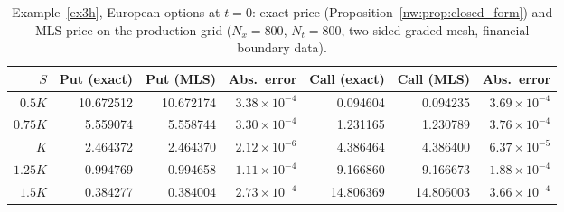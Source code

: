 \begin{table}[htbp]
\centering
\footnotesize
\caption{Example~\ref{ex3h}, European options at $t=0$: exact price (Proposition~\ref{nw:prop:closed_form}) and MLS price on the production grid ($N_x=800$, $N_t=800$, two-sided graded mesh, financial boundary data).}
\label{tab:ex1_european_pointwise}
\begin{tabular}{rrrrrrr}
\toprule
$S$ & Put (exact) & Put (MLS) & Abs.\ error & Call (exact) & Call (MLS) & Abs.\ error \\
\midrule
$0.5K$ & 10.672512 & 10.672174 & $3.38\times10^{-4}$ & 0.094604 & 0.094235 & $3.69\times10^{-4}$ \\
$0.75K$ & 5.559074 & 5.558744 & $3.30\times10^{-4}$ & 1.231165 & 1.230789 & $3.76\times10^{-4}$ \\
$K$ & 2.464372 & 2.464370 & $2.12\times10^{-6}$ & 4.386464 & 4.386400 & $6.37\times10^{-5}$ \\
$1.25K$ & 0.994769 & 0.994658 & $1.11\times10^{-4}$ & 9.166860 & 9.166673 & $1.88\times10^{-4}$ \\
$1.5K$ & 0.384277 & 0.384004 & $2.73\times10^{-4}$ & 14.806369 & 14.806003 & $3.66\times10^{-4}$ \\
\bottomrule
\end{tabular}
\end{table}
